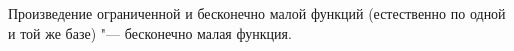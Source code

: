 \label{bm}
 Произведение ограниченной и бесконечно малой функций (естественно по одной и той же базе) "--- бесконечно малая функция.
 